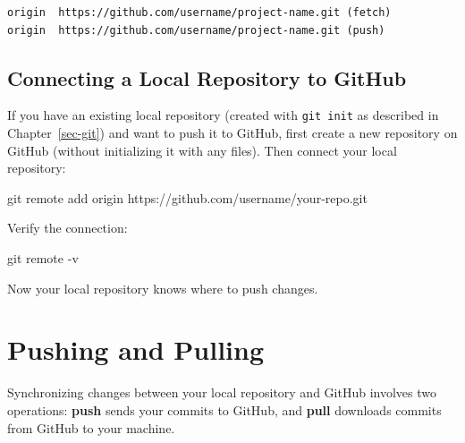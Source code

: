 \documentclass[
  letterpaper,
  DIV=11,
  numbers=noendperiod]{scrreprt}
\newenvironment{Shaded}{\begin{snugshade}}{\end{snugshade}}
\newcommand{\AttributeTok}[1]{\textcolor[rgb]{0.40,0.45,0.13}{#1}}
\newcommand{\FunctionTok}[1]{\textcolor[rgb]{0.28,0.35,0.67}{#1}}
\newcommand{\NormalTok}[1]{\textcolor[rgb]{0.00,0.23,0.31}{#1}}
\begin{document}
\begin{verbatim}
origin  https://github.com/username/project-name.git (fetch)
origin  https://github.com/username/project-name.git (push)
\end{verbatim}

\subsection{Connecting a Local Repository to
GitHub}\label{connecting-a-local-repository-to-github}

If you have an existing local repository (created with
\texttt{git\ init} as described in Chapter~\ref{sec-git}) and want to
push it to GitHub, first create a new repository on GitHub (without
initializing it with any files). Then connect your local repository:

\begin{codelisting}

\caption{\texttt{terminal}}

\begin{Shaded}
\begin{Highlighting}[]
\FunctionTok{git}\NormalTok{ remote add origin https://github.com/username/your{-}repo.git}
\end{Highlighting}
\end{Shaded}

\end{codelisting}

Verify the connection:

\begin{codelisting}

\caption{\texttt{terminal}}

\begin{Shaded}
\begin{Highlighting}[]
\FunctionTok{git}\NormalTok{ remote }\AttributeTok{{-}v}
\end{Highlighting}
\end{Shaded}

\end{codelisting}

Now your local repository knows where to push changes.

\section{Pushing and Pulling}\label{pushing-and-pulling}

Synchronizing changes between your local repository and GitHub involves
two operations: \textbf{push} sends your commits to GitHub, and
\textbf{pull} downloads commits from GitHub to your machine.
\end{document}
